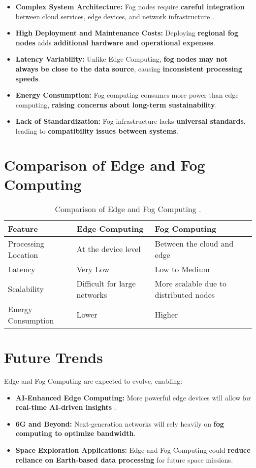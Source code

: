 \documentclass[a4paper,12pt]{article}
\begin{document}
	\begin{itemize}
		\item \textbf{Complex System Architecture:} Fog nodes require \textbf{careful integration} between cloud services, edge devices, and network infrastructure \cite{weber2021edge}.
		\item \textbf{High Deployment and Maintenance Costs:} Deploying \textbf{regional fog nodes} adds \textbf{additional hardware and operational expenses}.
		\item \textbf{Latency Variability:} Unlike Edge Computing, \textbf{fog nodes may not always be close to the data source}, causing \textbf{inconsistent processing speeds}.
		\item \textbf{Energy Consumption:} Fog computing consumes more power than edge computing, \textbf{raising concerns about long-term sustainability}.
		\item \textbf{Lack of Standardization:} Fog infrastructure lacks \textbf{universal standards}, leading to \textbf{compatibility issues between systems}.
	\end{itemize}
	
	\section{Comparison of Edge and Fog Computing}
	\begin{table}[h]
		\centering
		\begin{tabular}{|l|l|l|}
			\hline
			\textbf{Feature} & \textbf{Edge Computing} & \textbf{Fog Computing} \\
			\hline
			Processing Location & At the device level & Between the cloud and edge \\
			Latency & Very Low & Low to Medium \\
			Scalability & Difficult for large networks & More scalable due to distributed nodes \\
			Energy Consumption & Lower & Higher \\
			\hline
		\end{tabular}
		\caption{Comparison of Edge and Fog Computing \cite{shi2016edge}.}
	\end{table}
	
	\section{Future Trends}
	Edge and Fog Computing are expected to evolve, enabling:
	\begin{itemize}
		\item \textbf{AI-Enhanced Edge Computing:} More powerful edge devices will allow for \textbf{real-time AI-driven insights} \cite{chiang2017fog}.
		\item \textbf{6G and Beyond:} Next-generation networks will rely heavily on \textbf{fog computing to optimize bandwidth}.
		\item \textbf{Space Exploration Applications:} Edge and Fog Computing could \textbf{reduce reliance on Earth-based data processing} for future space missions.
	\end{itemize}
	
\end{document}
